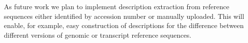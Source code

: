 \documentclass[final, slidestop]{beamer}
\begin{document}
\begin{frame}{}
\begin{myPoster}
{      As future work we plan to implement description extraction from reference
      sequences either identified by accession number or manually uploaded.
      This will enable, for example, easy construction of descriptions for the
      difference between different versions of genomic or transcript reference
      sequences.
    }
  \end{myPoster}
\end{frame}
\end{document}
